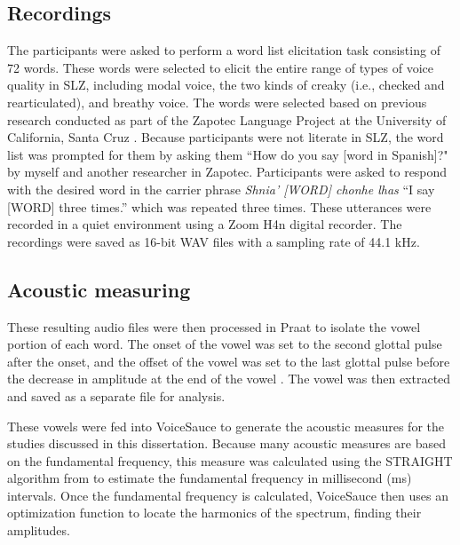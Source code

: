 \subsection{Recordings} \label{sec:acousticlandscape:recordings} 
The participants were asked to perform a word list elicitation task consisting of 72 words. These words were selected to elicit the entire range of types of voice quality in SLZ, including modal voice, the two kinds of creaky (i.e., checked and rearticulated), and breathy voice. The words were selected based on previous research conducted as part of the Zapotec Language Project at the University of California, Santa Cruz \citep{ZapotecLanguageProject}. 
Because participants were not literate in SLZ, the word list was prompted for them by asking them ``How do you say [word in Spanish]?" by myself and another researcher in Zapotec. Participants were asked to respond with the desired word in the carrier phrase \textit{Shnia' [WORD] chonhe lhas} ``I say [WORD] three times.'' which was repeated three times. These utterances were recorded in a quiet environment using a Zoom H4n digital recorder. The recordings were saved as 16-bit WAV files with a sampling rate of 44.1 kHz.

\subsection{Acoustic measuring} \label{sec:acousticlandscape:analysis}

These resulting audio files were then processed in Praat to isolate the vowel portion of each word. The onset of the vowel was set to the second glottal pulse after the onset, and the offset of the vowel was set to the last glottal pulse before the decrease in amplitude at the end of the vowel \citep{garellekAcousticDiscriminabilityComplex2020}. The vowel was then extracted and saved as a separate file for analysis.

These vowels were fed into VoiceSauce \citep{shueVoiceSauceProgramVoice2011} to generate the acoustic measures for the studies discussed in this dissertation. Because many acoustic measures are based on the fundamental frequency, this measure was calculated using the STRAIGHT algorithm from \citep{kawaharaInstantaneousfrequencybasedPitchExtraction1998} to estimate the fundamental frequency in millisecond (ms) intervals. Once the fundamental frequency is calculated, VoiceSauce then uses an optimization function to locate the harmonics of the spectrum, finding their amplitudes.

